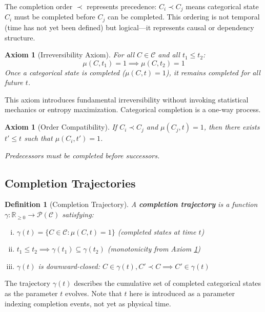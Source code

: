 \documentclass[11pt]{article}
\newtheorem{definition}[theorem]{Definition}
\newtheorem{axiom}[theorem]{Axiom}
\theoremstyle{remark}
\begin{document}
The completion order $\prec$ represents precedence: $C_i \prec C_j$ means categorical state $C_i$ must be completed before $C_j$ can be completed. This ordering is not temporal (time has not yet been defined) but logical—it represents causal or dependency structure.

\begin{axiom}[Irreversibility Axiom]
\label{axiom:irreversibility}
For all $C \in \mathcal{C}$ and all $t_1 \leq t_2$:
\begin{equation}
\mu(C, t_1) = 1 \implies \mu(C, t_2) = 1
\end{equation}
Once a categorical state is completed ($\mu(C, t) = 1$), it remains completed for all future $t$.
\end{axiom}

This axiom introduces fundamental irreversibility without invoking statistical mechanics or entropy maximization. Categorical completion is a one-way process.

\begin{axiom}[Order Compatibility]
\label{axiom:order_compatibility}
If $C_i \prec C_j$ and $\mu(C_j, t) = 1$, then there exists $t' \leq t$ such that $\mu(C_i, t') = 1$.

Predecessors must be completed before successors.
\end{axiom}

\subsection{Completion Trajectories}

\begin{definition}[Completion Trajectory]
\label{def:completion_trajectory}
A \textbf{completion trajectory} is a function $\gamma: \mathbb{R}_{\geq 0} \to \mathcal{P}(\mathcal{C})$ satisfying:
\begin{enumerate}[(i)]
\item $\gamma(t) = \{C \in \mathcal{C} : \mu(C, t) = 1\}$ (completed states at time $t$)
\item $t_1 \leq t_2 \implies \gamma(t_1) \subseteq \gamma(t_2)$ (monotonicity from Axiom \ref{axiom:irreversibility})
\item $\gamma(t)$ is downward-closed: $C \in \gamma(t), C' \prec C \implies C' \in \gamma(t)$
\end{enumerate}
\end{definition}

The trajectory $\gamma(t)$ describes the cumulative set of completed categorical states as the parameter $t$ evolves. Note that $t$ here is introduced as a parameter indexing completion events, not yet as physical time.
\end{document}

